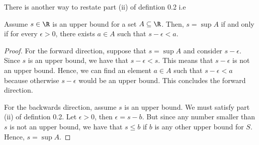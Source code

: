 There is another way to restate part (ii) of defintion 0.2 i.e 
\begin{tcolorbox}
\begin{lem}
Assume \( s \in \R \) is an upper bound for a set \( A \subseteq \R \). Then, \( s = \sup A \) if and only if for every \( \epsilon > 0 \), there exists \( a \in A \) such that \( s - \epsilon < a \).
\end{lem}
\end{tcolorbox}

\begin{proof}
For the forward direction, suppose that \( s = \sup A \) and consider \( s - \epsilon \). Since \( s \) is an upper bound, we have that \( s -\epsilon < s \). This means that \( s - \epsilon \) is not an upper bound. Hence, we can find an element \( a \in A \) such that \( s - \epsilon < a \) because otherwise \( s - \epsilon \) would be an upper bound. This concludes the forward direction.

For the backwards direction, assume \( s \) is an upper bound. We must satisfy part (ii) of defintion 0.2. Let \( \epsilon > 0 \), then \( \epsilon = s - b \). But since any number smaller than \( s \) is not an upper bound, we have that \( s \leq b \) if \( b \) is any other upper bound for \( S \).
Hence, \( s = \sup A \). 
\end{proof}




